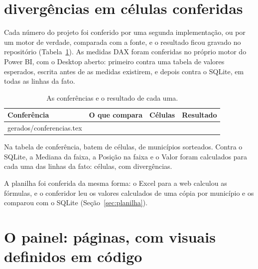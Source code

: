 \documentclass[11pt,a4paper]{article}
\makeatletter
\newcommand{\linhasde}[1]{\@@input #1 }
\newenvironment{codigo}
  {\par\smallskip\begin{lrbox}{\codigocaixa}\begin{minipage}{1.2\linewidth}\footnotesize}
  {\end{minipage}\end{lrbox}\noindent\makebox[\linewidth][l]{\usebox{\codigocaixa}}\par\smallskip}
\makeatother
\begin{document}
\begin{codigo}\end{codigo}

\section{\NumDivergenciasCompletas{} divergências em \NumCelulasCompletas{} células conferidas}
\label{sec:conferencia}

Cada número do projeto foi conferido por uma segunda implementação, ou por
um motor de verdade, comparada com a fonte, e o resultado ficou gravado no
repositório (Tabela~\ref{tab:conferencias}). As medidas DAX foram
conferidas no próprio motor do Power BI, com o Desktop aberto: primeiro
contra uma tabela de valores esperados, escrita antes de as medidas
existirem, e depois contra o SQLite, em todas as linhas da fato.

\begin{table}[H]
  \centering
  \caption{As conferências e o resultado de cada uma.}
  \label{tab:conferencias}
  \small
  \begin{tabular}{@{}p{3.7cm}p{5.4cm}rr@{}}
    \toprule
    Conferência & O que compara & Células & Resultado \\
    \midrule
    \linhasde{gerados/conferencias.tex}
    \bottomrule
  \end{tabular}
\end{table}

\begin{destaque}
  Na tabela de conferência, batem \NumCelulasBatem{} de
  \NumCelulasConferencia{} células, de \NumMunicipiosConferencia{}
  municípios sorteados. Contra o SQLite, a Mediana da faixa, a Posição na
  faixa e o Valor foram calculados para cada uma das \NumLinhasFato{}
  linhas da fato: \NumCelulasCompletas{} células, com
  \NumDivergenciasCompletas{} divergências.
\end{destaque}

A planilha foi conferida da mesma forma: o Excel para a web calculou as
fórmulas, e o conferidor leu os valores calculados de uma cópia por
município e os comparou com o SQLite (Seção~\ref{sec:planilha}).

\section{O painel: \NumPaginasPainel{} páginas, com visuais definidos em código}
\label{sec:painel}
\end{document}
